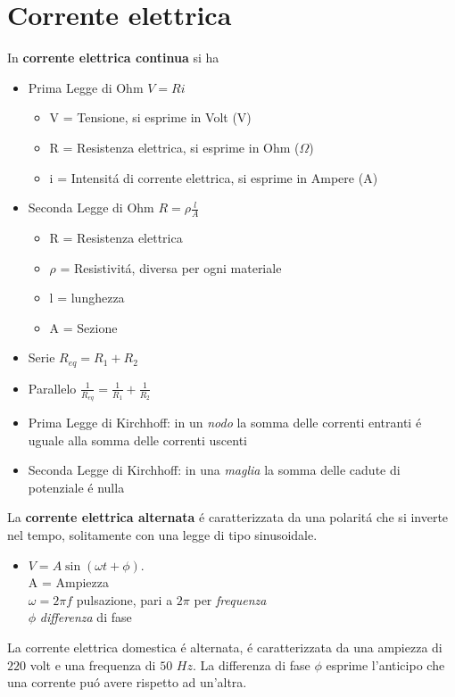 \documentclass[17pt]{article}
\begin{document}
\section{Corrente elettrica}

In {\bf corrente elettrica continua} si ha

\begin{itemize}
	\item Prima Legge di Ohm $V = Ri$
		\begin{itemize}
			\item V = Tensione, si esprime in Volt (V)
			\item R = Resistenza elettrica, si esprime in Ohm ($\Omega$)
			\item i = Intensit\'a di corrente elettrica, si esprime in Ampere (A)
		\end{itemize}
	\item Seconda Legge di Ohm $R=\rho\frac{l}{A}$
		\begin{itemize}
			\item R = Resistenza elettrica
			\item $\rho$ = Resistivit\'a, diversa per ogni materiale
			\item l = lunghezza
			\item A = Sezione
		\end{itemize}
	\item Serie $R_{eq} = R_1 + R_2$
	\item Parallelo $\frac{1}{R_{eq}} = \frac{1}{R_1} + \frac{1}{R_2}$
	\item Prima Legge di Kirchhoff: in un \emph{nodo} la somma delle correnti entranti \'e uguale alla somma delle correnti uscenti
	\item Seconda Legge di Kirchhoff: in una \emph{maglia} la somma delle cadute di potenziale \'e nulla
\end{itemize}

La {\bf corrente elettrica alternata} \'e caratterizzata da una polarit\'a che si inverte nel tempo, solitamente con una legge di tipo sinusoidale. 
\begin{itemize}
	\item $V = A\sin{(\omega t + \phi)}$.\\
	A = Ampiezza\\
	$\omega = 2\pi f$ pulsazione, pari a $2\pi$ per \emph{frequenza}\\
	$\phi$ \emph{differenza} di fase
\end{itemize}

La corrente elettrica domestica \'e alternata, \'e caratterizzata da una ampiezza di $220$ volt e una frequenza di $50$ $Hz$. La differenza di fase $\phi$ esprime l'anticipo che una corrente pu\'o avere rispetto ad un'altra.
\end{document}
